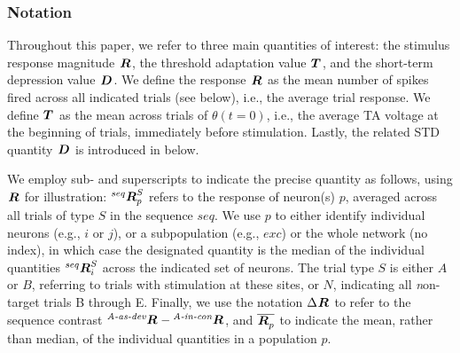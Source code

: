 \documentclass[9pt,lineno,onehalfspacing]{elife}
\newcommand{\dev}{\textit{A-as-dev}}
\newcommand{\msc}{\textit{A-in-con}}
\newcommand{\std}{\textit{A-as-std}}
\newcommand{\ifstringequal}[4]{%
  \ifnum\pdfstrcmp{#1}{#2}=0
  #3%
  \else
  #4%
  \fi
}
\newcommand{\seqreplace}[1]{\ifstringequal{dev}{#1}{\dev}{%
    \ifstringequal{std}{#1}{\std}{%
        \ifstringequal{msc}{#1}{\msc}{#1}%
    }%
}}
\newcommand{\R}[3][]{{}^{\seqreplace{#1}}_{}\boldsymbol R^{#2}_{#3}}
\newcommand{\T}[3][]{{}^{\seqreplace{#1}}_{}\boldsymbol T^{#2}_{#3}}
\newcommand{\D}[3][]{{}^{\seqreplace{#1}}_{}\boldsymbol D^{#2}_{#3}}
\newcommand{\mean}[1]{\overline{#1}}
\begin{document}
\subsubsection{Notation}
Throughout this paper, we refer to three main quantities of interest: the stimulus response magnitude $\R{}{}$, the threshold adaptation value $\T{}{}$, and the short-term depression value $\D{}{}$. We define the response $\R{}{}$ as the mean number of spikes fired across all indicated trials (see below), i.e., the average trial response. We define $\T{}{}$ as the mean across trials of $\theta(t=0)$, i.e., the average TA voltage at the beginning of trials, immediately before stimulation. Lastly, the related STD quantity $\D{}{}$ is introduced in  below.

We employ sub- and superscripts to indicate the precise quantity as follows, using $\R{}{}$ for illustration: $\R[seq]{S}{p}$ refers to the response of neuron(s) $p$, averaged across all trials of type $S$ in the sequence $seq$. We use $p$ to either identify individual neurons (e.g., $i$ or $j$), or a subpopulation (e.g., $exc$) or the whole network (no index), in which case the designated quantity is the median of the individual quantities $\R[seq]{S}{i}$ across the indicated set of neurons. The trial type $S$ is either $A$ or $B$, referring to trials with stimulation at these sites, or $N$, indicating all \textit{n}on-target trials B through E. Finally, we use the notation $\Delta \R{}{}$ to refer to the sequence contrast $\R[dev]{}{} - \R[msc]{}{}$, and $\mean{\R{}{p}}$ to indicate the mean, rather than median, of the individual quantities in a population $p$.
\end{document}
